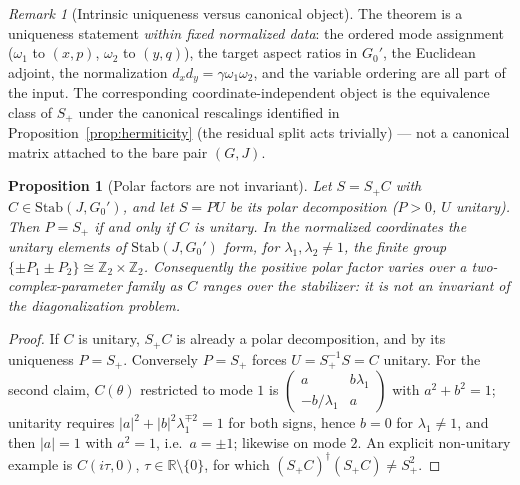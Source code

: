 \documentclass[11pt]{article}
\newtheorem{proposition}[theorem]{Proposition}
\theoremstyle{definition}
\theoremstyle{remark}
\newtheorem{remark}[theorem]{Remark}
\newcommand{\R}{\mathbb{R}}
\newcommand{\w}{\omega}
\newcommand{\Stab}{\mathrm{Stab}}
\newcommand{\dg}{\dagger}
\begin{document}
\begin{remark}[Intrinsic uniqueness versus canonical object]
\label{rem:relativedata}
The theorem is a uniqueness statement \emph{within fixed normalized
data}: the ordered mode assignment ($\w_1$ to $(x,p)$, $\w_2$ to
$(y,q)$), the target aspect ratios in $G_0'$, the Euclidean adjoint, the
normalization $d_xd_y=\gamma\w_1\w_2$, and the variable ordering are all
part of the input.  The corresponding coordinate-independent object is
the equivalence class of $S_+$ under the canonical rescalings identified
in Proposition~\ref{prop:hermiticity} (the residual split acts trivially)
--- not a canonical matrix attached to the bare pair $(G,J)$.
\end{remark}

\begin{proposition}[Polar factors are not invariant]\label{prop:polar}
Let $S=S_+C$ with $C\in\Stab(J,G_0')$, and let $S=PU$ be its polar
decomposition ($P>0$, $U$ unitary).  Then $P=S_+$ if and only if $C$ is
unitary.  In the normalized coordinates the unitary elements of
$\Stab(J,G_0')$ form, for $\lambda_1,\lambda_2\neq1$, the finite group
$\{\pm P_1\pm P_2\}\cong\mathbb{Z}_2\times\mathbb{Z}_2$.  Consequently the
positive polar factor varies over a two-complex-parameter family as $C$
ranges over the stabilizer: it is not an invariant of the diagonalization
problem.
\end{proposition}

\begin{proof}
If $C$ is unitary, $S_+C$ is already a polar decomposition, and by its
uniqueness $P=S_+$.  Conversely $P=S_+$ forces $U=S_+^{-1}S=C$ unitary.  For
the second claim, $C(\theta)$ restricted to mode $1$ is
$\left(\begin{smallmatrix}a&b\lambda_1\\-b/\lambda_1&a\end{smallmatrix}\right)$
with $a^2+b^2=1$; unitarity requires
$|a|^2+|b|^2\lambda_1^{\mp2}=1$ for both signs, hence $b=0$ for
$\lambda_1\neq1$, and
then $|a|=1$ with $a^2=1$, i.e.\ $a=\pm1$; likewise on mode $2$.  An explicit
non-unitary example is $C(i\tau,0)$, $\tau\in\R\setminus\{0\}$, for which
$(S_+C)^{\dg}(S_+C)\neq S_+^2$.
\end{proof}
\end{document}
